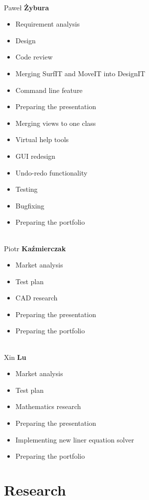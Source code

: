 \documentclass[a4paper, 11pt, article]{report}
\begin{document}
\noindent \\ Paweł \textbf{Żybura} 
\begin{itemize}
	\item Requirement analysis
	\item Design
	\item Code review
	\item Merging SurfIT and MoveIT into DesignIT
	\item Command line feature
	\item Preparing the presentation
	\item Merging views to one class
	\item Virtual help tools
	\item GUI redesign
	\item Undo-redo functionality
	\item Testing 
	\item Bugfixing
	\item Preparing the portfolio
\end{itemize}

\noindent \\ Piotr \textbf{Kaźmierczak} 
\begin{itemize}
	\item Market analysis
	\item Test plan
	\item CAD research
	\item Preparing the presentation
	\item Preparing the portfolio
\end{itemize}

\noindent \\ Xin \textbf{Lu}
\begin{itemize}
	\item Market analysis
	\item Test plan
	\item Mathematics research
	\item Preparing the presentation
	\item Implementing new liner equation solver
	\item Preparing the portfolio
\end{itemize}


\chapter{Research}
\end{document}
